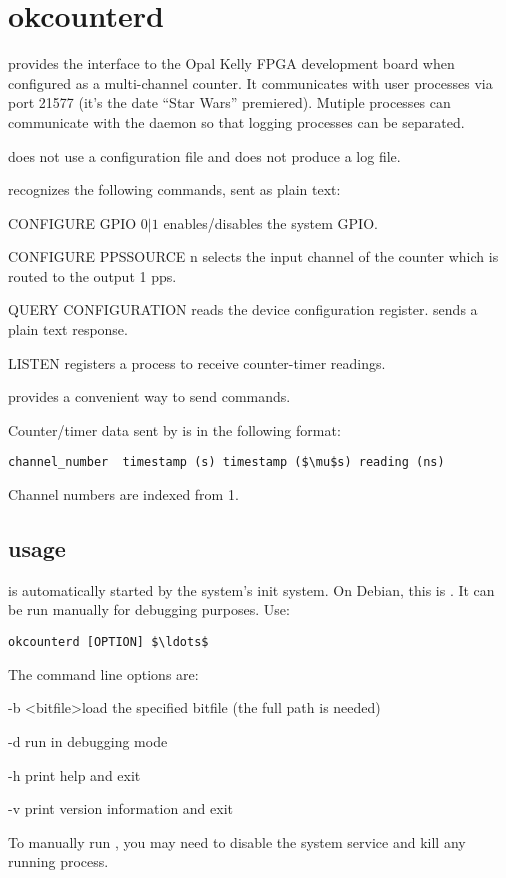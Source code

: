 
\section{okcounterd \label{sokcounterd}}

\hypertarget{h:okcounterd}{}

 provides the interface to the Opal Kelly FPGA development board when configured as a multi-channel counter.
It communicates with user processes via port 21577 (it's the date ``Star Wars'' premiered).
Mutiple processes can communicate with the daemon so that logging processes can be separated.

 does not use a configuration file and does not produce a log file.

 recognizes the following commands, sent as plain text:
\begin{description*}
	\item[] CONFIGURE GPIO $0\vert1$ enables/disables the system GPIO.
	\item[] CONFIGURE PPSSOURCE n selects the input channel of the counter which is
	routed to the output 1 pps. 
	\item[] QUERY CONFIGURATION reads the device configuration register.  sends
	a plain text response.
	\item[] LISTEN registers a process to receive counter-timer readings.
\end{description*}
 provides a convenient way to send commands.

Counter/timer data sent by  is in the following format:
\begin{lstlisting}[mathescape=true]
channel_number  timestamp (s) timestamp ($\mu$s) reading (ns)
\end{lstlisting}
Channel numbers are indexed from 1.

\subsection{usage}
 is automatically started by the system's init system. On Debian, this is . 
It can be run manually for debugging purposes. Use:
\begin{lstlisting}[mathescape=true]
okcounterd [OPTION] $\ldots$
\end{lstlisting}
The command line options are:
\begin{description*}
	\item[-b] \textless bitfile\textgreater load the specified bitfile (the full path is needed)
	\item[-d]	run in debugging mode
	\item[-h]	print help and exit
	\item[-v]	print version information and exit
\end{description*}
To manually run , you may need to disable the system service
and kill any running  process.
